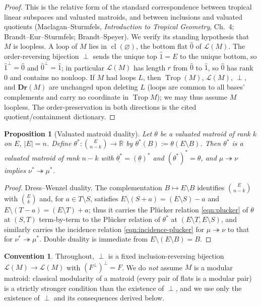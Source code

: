 \documentclass{article}
\newtheorem{proposition}[theorem]{Proposition}
\theoremstyle{definition}
\newtheorem{convention}[theorem]{Convention}
\newcommand{\Rbar}{\overline{\mathbb{R}}}
\newcommand{\cl}{\operatorname{cl}}
\newcommand{\Trop}{\operatorname{Trop}}
\newcommand{\onto}{\twoheadrightarrow}
\newcommand{\Dr}{\mathbf{Dr}}
\newcommand{\cLL}{\mathcal{L}}
\begin{document}
\begin{proof}
This is the relative form of the standard correspondence between tropical linear subspaces and
valuated matroids, and between inclusions and valuated quotients (Maclagan--Sturmfels,
\emph{Introduction to Tropical Geometry}, Ch.~4; Brandt--Eur--Sturmfels; Brandt--Speyer). We verify
its standing hypothesis that $M$ is loopless. A loop of $M$ lies in $\cl(\varnothing)$, the bottom
flat $\hat0$ of $\cLL(M)$. The order-reversing bijection $\perp$ sends the unique top
$\hat1=E$ to the unique bottom, so $\hat1^{\perp}=\hat0$ and $\hat0^{\perp}=\hat1$; in particular
$\cLL(M)$ has length $r$ from $\hat0$ to $\hat1$, so $\hat0$ has rank $0$ and contains no nonloop.
If $M$ had loops $L$, then $\Trop(M)$, $\cLL(M)$, $\perp$, and $\Dr(M)$ are unchanged upon deleting
$L$ (loops are common to all bases' complements and carry no coordinate in $\Trop M$); we may thus
assume $M$ loopless. The order-preservation in both directions is the cited quotient/containment
dictionary.
\end{proof}

\begin{proposition}[Valuated matroid duality]\label{fact:dual}
Let $\theta$ be a valuated matroid of rank $k$ on $E$, $|E|=n$. Define
$\theta^{*}\colon\binom{E}{n-k}\to\Rbar$ by $\theta^{*}(B):=\theta(E\setminus B)$. Then $\theta^{*}$
is a valuated matroid of rank $n-k$ with $\underline{\theta^{*}}=(\underline\theta)^{*}$ and
$(\theta^{*})^{*}=\theta$, and $\mu\onto\nu$ implies $\nu^{*}\onto\mu^{*}$.
\end{proposition}

\begin{proof}
Dress--Wenzel duality. The complementation $B\mapsto E\setminus B$ identifies $\binom{E}{n-k}$ with
$\binom{E}{k}$ and, for $a\in T\setminus S$, satisfies $E\setminus(S+a)=(E\setminus S)-a$ and
$E\setminus(T-a)=(E\setminus T)+a$; thus it carries the Pl\"ucker relation \eqref{eqn:plucker} of
$\theta$ at $(S,T)$ term-by-term to the Pl\"ucker relation of $\theta^{*}$ at $(E\setminus
T,E\setminus S)$, and similarly carries the incidence relation \eqref{eqn:incidence-plucker} for
$\mu\onto\nu$ to that for $\nu^{*}\onto\mu^{*}$. Double duality is immediate from $E\setminus
(E\setminus B)=B$.
\end{proof}

\begin{convention}\label{conv:perp}
Throughout, $\perp$ is a fixed inclusion-reversing bijection $\cLL(M)\to\cLL(M)$ with
$(F^{\perp})^{\perp}=F$. We do \emph{not} assume $M$ is a modular matroid: classical modularity of a
matroid (every pair of flats is a modular pair) is a strictly stronger condition than the existence
of $\perp$, and we use only the existence of $\perp$ and its consequences derived below.
\end{convention}
\end{document}
